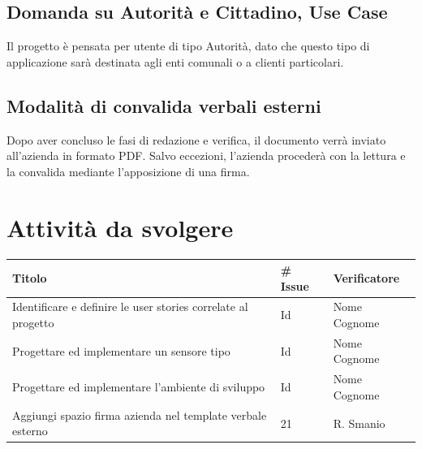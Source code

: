 \documentclass{article}
\begin{document}
    \subsection{Domanda su Autorità e Cittadino, Use Case}
        Il progetto è pensata per utente di tipo Autorità, dato che questo tipo di applicazione sarà destinata agli enti comunali o a clienti particolari.

    \subsection{Modalità di convalida verbali esterni}
        Dopo aver concluso le fasi di redazione e verifica, il documento verrà inviato all'azienda in formato PDF. Salvo eccezioni, l'azienda procederà con la lettura e la convalida mediante l'apposizione di una firma.

\section{Attività da svolgere}  %
    \begin{center}
        \begin{tabular}{|C{7cm}|C{1,5cm}|C{3cm}|} 
            \hline
            \textbf{Titolo} & \textbf{\# Issue} & \textbf{Verificatore} \\ \hline\hline
            Identificare e definire le user stories correlate al progetto & Id & Nome Cognome \\
            Progettare ed implementare un sensore tipo & Id & Nome Cognome \\
            Progettare ed implementare l'ambiente di sviluppo  & Id & Nome Cognome \\
            Aggiungi spazio firma azienda nel template verbale esterno & 21 & R. Smanio \\
            \hline
        \end{tabular}
    \end{center}
\end{document}
